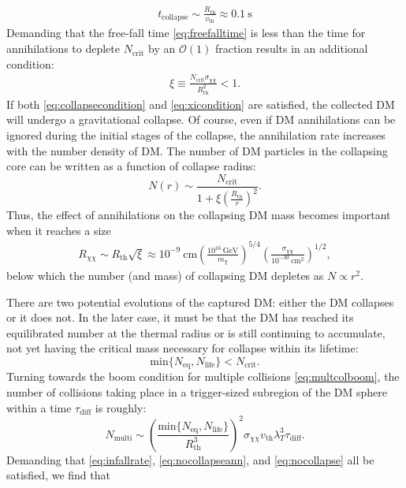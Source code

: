 \documentclass[preprintnumbers,amsmath,amssymb,prd,superscriptaddress]{revtex4}
\newcommand{\OO}{\mathcal{O}}
\newcommand{\GeV}{\text{GeV}}
\newcommand{\cm}{\text{cm}}
\def\r{\right)}
\def\l{\left(}
\begin{document}
\begin{align}
\label{eq:freefalltime}
  t_\text{collapse} \sim \frac{R_\text{th}}{v_\text{th}} \approx 0.1 ~\text{s}
\end{align}
Demanding that the free-fall time \eqref{eq:freefalltime} is less than the time for annihilations to deplete $N_\text{crit}$ by an $\OO(1)$ fraction results in an additional condition:
\begin{align}
\label{eq:xicondition}
\xi \equiv \frac{N_\text{crit} \sigma_{\chi \chi}}{R_\text{th}^2} < 1.
\end{align}
If both \eqref{eq:collapsecondition} and \eqref{eq:xicondition} are satisfied, the collected DM will undergo a gravitational collapse.
Of course, even if DM annihilations can be ignored during the initial stages of the collapse, the annihilation rate increases with the number density of DM. 
The number of DM particles in the collapsing core can be written as a function of collapse radius:
\begin{equation}
\label{eq:DMcollapsedeplete}
N(r) \sim \frac{N_\text{crit}}{1 + \xi \l \frac{R_\text{th}}{r}\r^2}. 
\end{equation}
Thus, the effect of annihilations on the collapsing DM mass becomes important when it reaches a size
\begin{align}
R_{\chi \chi} \sim R_\text{th} \sqrt{\xi} \approx 10^{-9} ~\cm  \l \frac{10^{16} ~\GeV}{m_\chi} \r^{5/4} \l \frac{\sigma_{\chi \chi}}{10^{-30} ~\cm^2} \r^{1/2}, 
\end{align}
below which the number (and mass) of collapsing DM depletes as $N \propto r^2$. 

There are two potential evolutions of the captured DM: either the DM collapses or it does not. 
In the later case, it must be that the DM has reached its equilibrated number at the thermal radius or is still continuing to accumulate, not yet having the critical mass necessary for collapse within its lifetime:
\begin{equation}
\label{eq:nocollapseann}
\text{min}\{N_\text{eq}, N_\text{life}\} < N_\text{crit}.
\end{equation}
Turning towards the boom condition for multiple collisions \eqref{eq:multcolboom}, the number of collisions taking place in a trigger-sized subregion of the DM sphere within a time $\tau_\text{diff}$ is roughly:
\begin{equation}
\label{eq:nocollapse}
N_\text{multi} \sim \l \frac{\text{min}\{N_\text{eq}, N_\text{life}\}}{R_\text{th}^3} \r^2 \sigma_{\chi \chi} v_\text{th} \lambda_T^3 \tau_\text{diff}. 
\end{equation}
Demanding that \eqref{eq:infallrate}, \eqref{eq:nocollapseann}, and \eqref{eq:nocollapse} all be satisfied, we find that
\end{document}
